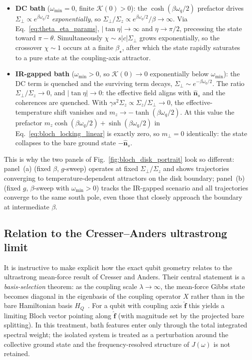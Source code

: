 \begin{itemize}
  \item \textbf{DC bath} ($\omega_{\min}=0$, finite $\mathcal{K}(0)>0$): the
  $\cosh(\beta\omega_q/2)$ prefactor drives $\Sigma_\perp\propto e^{\beta\omega_q/2}$
  \emph{exponentially}, so $\Sigma_\perp/\Sigma_z \propto e^{\beta\omega_q/2}/\beta\to\infty$.
  Via Eq.~\eqref{eq:theta_eta_params}, $|\tan\eta|\to\infty$ and $\eta\to\pi/2$,
  precessing the state toward $\pi-\theta$.  Simultaneously $\chi\sim s|c|\Sigma_\perp$
  grows exponentially, so the crossover $\chi\sim 1$ occurs at a finite $\beta_\star$,
  after which the state rapidly saturates to a pure state at the coupling-axis attractor.

  \item \textbf{IR-gapped bath} ($\omega_{\min}>0$, so $\mathcal{K}(0)\to 0$ exponentially
  below $\omega_{\min}$): the DC term is quenched and the surviving term decays,
  $\Sigma_\perp\sim e^{-\beta\omega_q/2}$.  The ratio $\Sigma_\perp/\Sigma_z\to 0$,
  and $|\tan\eta|\to 0$: the effective field aligns with $\hat{\mathbf n}_s$ and the
  coherences are quenched.  With $\gamma s^2\Sigma_z \propto\Sigma_z/\Sigma_\perp\to 0$,
  the effective-temperature shift vanishes and $m_z\to -\tanh(\beta\omega_q/2)$.
  At this value the prefactor $m_z\cosh(\beta\omega_q/2)+\sinh(\beta\omega_q/2)$
  in Eq.~\eqref{eq:bloch_locking_linear} is exactly zero, so $m_\perp=0$ identically:
  the state collapses to the bare ground state $-\hat{\mathbf n}_s$.
\end{itemize}

This is why the two panels of Fig.~\ref{fig:bloch_disk_portrait} look so different:
panel~(a) (fixed $\beta$, $g$-sweep) operates at fixed $\Sigma_\perp/\Sigma_z$ and shows
trajectories converging to temperature-dependent attractors on the disk boundary;
panel~(b) (fixed $g$, $\beta$-sweep with $\omega_{\min}>0$) tracks the IR-gapped
scenario and all trajectories converge to the same south pole, even those that closely
approach the boundary at intermediate $\beta$.


\subsection{Relation to the Cresser--Anders ultrastrong limit}
\label{subsec:qubit_relation_to_limits}

It is instructive to make explicit how the exact qubit geometry relates to the
ultrastrong mean-force result of Cresser and Anders.  Their central statement
is a \emph{basis-selection} theorem: as the coupling scale $\lambda\to\infty$,
the mean-force Gibbs state becomes diagonal in the eigenbasis of the coupling
operator $X$ rather than in the bare Hamiltonian basis
$H_Q$~\cite{cresserWeakUltrastrongCoupling2021a}.  For a qubit with coupling
axis $\hat{\mathbf f}$ this yields a limiting Bloch vector pointing along
$\hat{\mathbf f}$ (with magnitude set by the projected bare splitting).  In
this treatment, bath features enter only through the total integrated spectral
weight; the isolated system is treated as a perturbation around the collective
ground state and the frequency-resolved structure of $J(\omega)$ is not retained.


